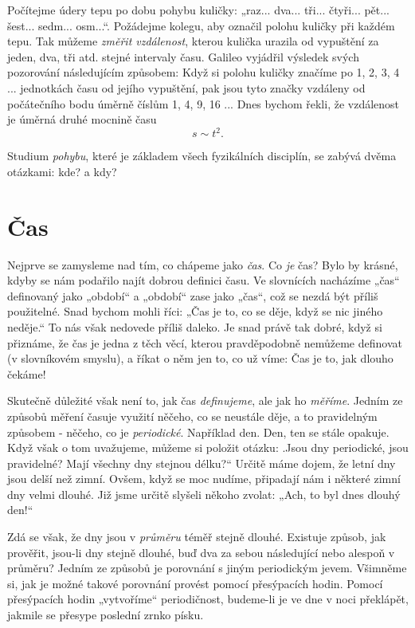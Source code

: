     Počítejme údery tepu po dobu pohybu kuličky: „raz... dva... tři... čtyři... pět... šest... 
    sedm... osm...“. Požádejme kolegu, aby označil polohu kuličky při každém tepu. Tak můžeme 
    \emph{změřit vzdálenost}, kterou kulička urazila od vypuštění za jeden, dva, tři atd. stejné 
    intervaly času. Galileo vyjádřil výsledek svých pozorování následujícím způsobem: Když si 
    polohu kuličky značíme po \num{1}, \num{2}, \num{3}, \num{4} ... jednotkách času od jejího 
    vypuštění, pak jsou tyto značky vzdáleny od počátečního bodu úměrně číslům \num{1}, \num{4}, 
    \num{9}, \num{16} ... Dnes bychom řekli, že vzdálenost je úměrná druhé mocnině času
    \begin{equation*}
      s \sim t^2.
    \end{equation*}
    
    Studium \emph{pohybu}, které je základem všech fyzikálních disciplín, se zabývá dvěma otázkami: 
    kde? a kdy?
    
  \section{Čas}
    Nejprve se zamysleme nad tím, co chápeme jako \emph{čas}. Co \emph{je} čas? Bylo by krásné, 
    kdyby se nám podařilo najít dobrou definici času. Ve slovnících nacházíme „čas“ definovaný jako 
    „období“ a „období“ zase jako „čas“, což se nezdá být příliš použitelné. Snad bychom mohli 
    říci: „Čas je to, co se děje, když se nic jiného neděje.“ To nás však nedovede příliš daleko. 
    Je snad právě tak dobré, když si přiznáme, že čas je jedna z těch věcí, kterou pravděpodobně 
    nemůžeme definovat (v slovníkovém smyslu), a říkat o něm jen to, co už víme: Čas je to, jak 
    dlouho čekáme!
    
    Skutečně důležité však není to, jak čas \emph{definujeme}, ale jak ho \emph{měříme}. Jedním ze 
    způsobů měření časuje využití něčeho, co se neustále děje, a to pravidelným způsobem - něčeho, 
    co je \emph{periodické}. Například den. Den, ten se stále opakuje. Když však o tom uvažujeme, 
    můžeme si položit otázku: .Jsou dny periodické, jsou pravidelné? Mají všechny dny stejnou 
    délku?“ Určitě máme dojem, že letní dny jsou delší než zimní. Ovšem, když se moc nudíme, 
    připadají nám i některé zimní dny velmi dlouhé. Již jsme určitě slyšeli někoho zvolat: „Ach, to 
    byl dnes dlouhý den!“
    
    Zdá se však, že dny jsou v \emph{průměru} téměř stejně dlouhé. Existuje způsob, jak prověřit, 
    jsou-li dny stejně dlouhé, buď dva za sebou následující nebo alespoň v průměru? Jedním ze 
    způsobů je porovnání s jiným periodickým jevem. Všimněme si, jak je možné takové porovnání 
    provést pomocí přesýpacích hodin. Pomocí přesýpacích hodin „vytvoříme“ periodičnost, budeme-li 
    je ve dne v noci překlápět, jakmile se přesype poslední zrnko písku.
    
